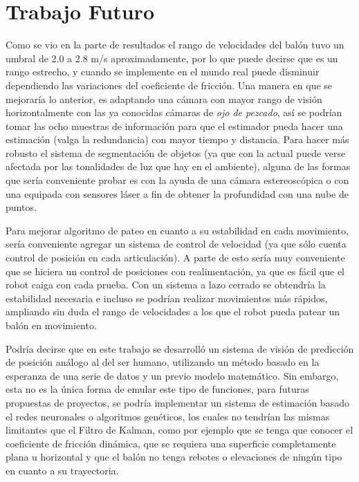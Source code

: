 	
\section{Trabajo Futuro}
	Como se vio en la parte de resultados el rango de velocidades del balón tuvo un umbral de 2.0 a 2.8 m/s aproximadamente, por lo que puede decirse que es un rango estrecho, y cuando se implemente en el mundo real puede disminuir dependiendo las variaciones del coeficiente de fricción. Una manera en que se mejoraría lo anterior, es adaptando una cámara con mayor rango de visión horizontalmente con las ya conocidas cámaras de \textit{ojo de pezcado}, así se podrían tomar las ocho muestras de información para que el estimador pueda hacer una estimación (valga la redundancia) con mayor tiempo y distancia. Para hacer más robusto el sistema de segmentación de objetos (ya que con la actual puede verse afectada por las tonalidades de luz que hay en el ambiente), alguna de las formas que sería conveniente probar es con la ayuda de una cámara estereoscópica o con una equipada con sensores láser a fin de obtener la profundidad con una nube de puntos.

	Para mejorar algoritmo de pateo en cuanto a su estabilidad en cada movimiento, sería conveniente agregar un sistema de control de velocidad (ya que sólo cuenta control de posición en cada articulación). A parte de esto sería muy conveniente que se hiciera un control de posiciones con realimentación, ya que es fácil que el robot caiga con cada prueba. Con un sistema a lazo cerrado se obtendría la estabilidad necesaria e incluso se podrían realizar movimientos más rápidos, ampliando sin duda el rango de velocidades a los que el robot pueda patear un balón en movimiento. 
		
	Podría decirse que en este trabajo se desarrolló un sistema de visión de predicción de posición análogo al del ser humano, utilizando un método basado en la esperanza de una serie de datos y un previo modelo matemático. Sin embargo, esta no es la única forma de emular este tipo de funciones, para futuras propuestas de proyectos, se podría implementar un sistema de estimación basado el redes neuronales o algoritmos genéticos, los cuales no tendrían las mismas limitantes que el Filtro de Kalman, como por ejemplo que se tenga que conocer el coeficiente de fricción dinámica, que se requiera una superficie completamente plana u horizontal y que el balón no tenga rebotes o elevaciones de ningún tipo en cuanto a su trayectoria.

